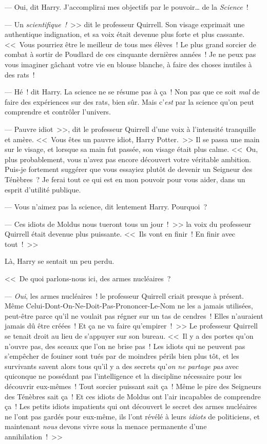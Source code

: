 --- Oui, dit Harry. J'accomplirai mes objectifs par le pouvoir… de la \emph{Science}~!

--- Un \emph{scientifique~!}~>> dit le professeur Quirrell. Son visage exprimait une authentique indignation, et sa voix était devenue plus forte et plus cassante. <<~Vous pourriez être le meilleur de tous mes élèves~! Le plus grand sorcier de combat à sortir de Poudlard de ces cinquante dernières années~! Je ne peux pas vous imaginer gâchant votre vie en blouse blanche, à faire des choses inutiles à des rats~!

--- Hé~! dit Harry. La science ne se résume pas à ça~! Non pas que ce soit \emph{mal} de faire des expériences sur des rats, bien sûr. Mais c'\emph{est} par la science qu'on peut comprendre et contrôler l'univers.

--- Pauvre idiot~>>, dit le professeur Quirrell d'une voix à l'intensité tranquille et amère. <<~Vous êtes un pauvre idiot, Harry Potter.~>> Il se passa une main sur le visage, et lorsque sa main fut passée, son visage était plus calme. <<~Ou, plus probablement, vous n'avez pas encore découvert votre véritable ambition. Puis-je fortement suggérer que vous essayiez plutôt de devenir un Seigneur des Ténèbres~? Je ferai tout ce qui est en mon pouvoir pour vous aider, dans un esprit d'utilité publique.

--- Vous n'aimez pas la science, dit lentement Harry. Pourquoi~?

--- Ces idiots de Moldus nous tueront tous un jour~!~>> la voix du professeur Quirrell était devenue plus puissante. <<~Ils vont en finir~! En finir avec tout~!~>>

Là, Harry se sentait un peu perdu.

<<~De quoi parlons-nous ici, des armes nucléaires~?

--- \emph{Oui}, les armes nucléaires~! le professeur Quirrell criait presque à présent. Même Celui-Dont-On-Ne-Doit-Pas-Prononcer-Le-Nom ne les a jamais utilisées, peut-être parce qu'il ne voulait pas régner sur un tas de cendres~! Elles n'auraient jamais dû être créées~! Et ça ne va faire qu'empirer~!~>> Le professeur Quirrell se tenait droit au lieu de s'appuyer sur son bureau. <<~Il y a des portes qu'on n'ouvre pas, des sceaux que l'on ne brise pas~! Les idiots qui ne peuvent pas s'empêcher de fouiner sont tués par de moindres périls bien plus tôt, et les survivants savent alors tous qu'il y a des secrets qu'\emph{on ne partage pas} avec quiconque ne possédant pas l'intelligence et la discipline nécessaire pour les découvrir eux-mêmes~! Tout sorcier puissant sait ça~! Même le pire des Seigneurs des Ténèbres sait ça~! Et ces idiots de Moldus ont l'air incapables de comprendre ça~! Les petits idiots impatients qui ont découvert le secret des armes nucléaires ne l'ont pas gardés pour eux-même, ils l'ont révélé à leurs \emph{idiots} de politiciens, et maintenant \emph{nous} devons vivre sous la menace permanente d'une annihilation~!~>>

